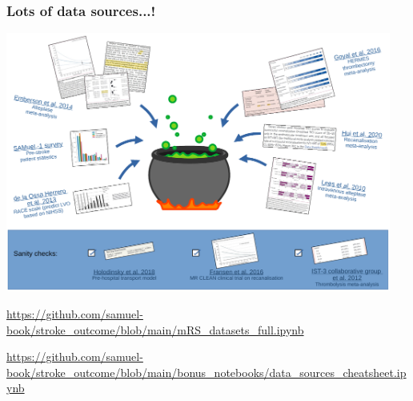 \documentclass[xcolor={usenames,dvipsnames}]{beamer}
\newcommand{\smallurl}[1]{\textcolor{blue}{\fontsize{4pt}{4.8pt}\selectfont \url{#1}}}
\begin{document}
\begin{frame}
\frametitle{Lots of data sources...!}


\begin{center} 
\includegraphics[width=0.95\textwidth]{./images/data_cauldron}
\end{center} 

\vspace{-1em}
\smallurl{https://github.com/samuel-book/stroke_outcome/blob/main/mRS_datasets_full.ipynb}

\vspace{-0.5em}
\smallurl{https://github.com/samuel-book/stroke_outcome/blob/main/bonus_notebooks/data_sources_cheatsheet.ipynb}

\end{frame}


\end{document}
